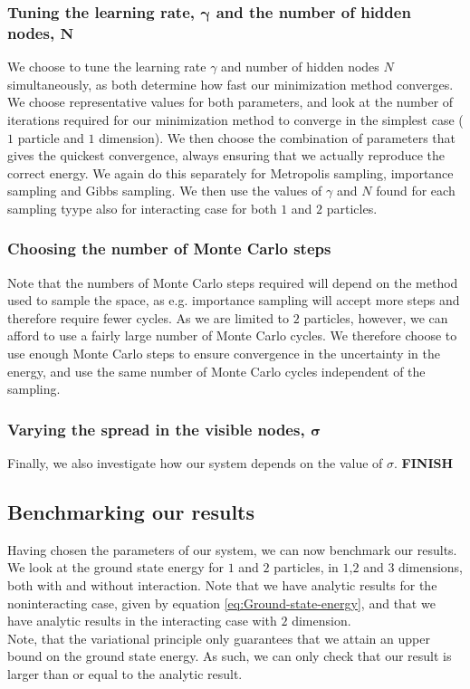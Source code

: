 \documentclass[a4paper, 10pt]{article}
\begin{document}
	\subsubsection{Tuning the learning rate, $\boldsymbol{\gamma}$ and the number of hidden nodes, $\boldsymbol{N}$}
	We choose to tune the learning rate $\gamma$ and number of hidden nodes $N$ simultaneously, as both determine how fast our minimization method converges. We choose representative values for both parameters, and look at the number of iterations required for our minimization method to converge in the simplest case ($1$ particle and $1$ dimension). We then choose the combination of parameters that gives the quickest convergence, always ensuring that we actually reproduce the correct energy. We again do this separately for Metropolis sampling, importance sampling and Gibbs sampling. We then use the values of $\gamma$ and $N$ found for each sampling tyype also for interacting case for both $1$ and $2$ particles.
	\subsubsection{Choosing the number of Monte Carlo steps}
	Note that the numbers of Monte Carlo steps required will depend on the method used to sample the space, as e.g. importance sampling will accept more steps and therefore require fewer cycles. As we are limited to $2$ particles, however, we can afford to use a fairly large number of Monte Carlo cycles. We therefore choose to use enough Monte Carlo steps to ensure convergence in the uncertainty in the energy, and use the same number of Monte Carlo cycles independent of the sampling. 
	\subsubsection{Varying the spread in the visible nodes, $\boldsymbol{\sigma}$}
	Finally, we also investigate how our system depends on the value of $\sigma$. \textbf{FINISH}
	\subsection{Benchmarking our results}
	Having chosen the parameters of our system, we can now benchmark our results. We look at the ground state energy for $1$ and $2$ particles, in $1$,$2$ and $3$ dimensions, both with and without interaction. Note that we have analytic results for the noninteracting case, given by equation \ref{eq:Ground-state-energy}, and that we have analytic results in the interacting case with $2$ dimension.\\
	\linebreak
	Note, that the variational principle only guarantees that we attain an upper bound on the ground state energy. As such, we can only check that our result is larger than or equal to the analytic result.
\end{document}
